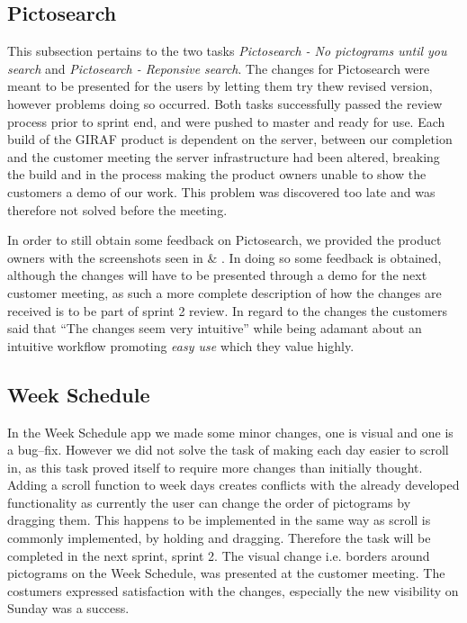 \subsection{Pictosearch}
This subsection pertains to the two tasks \textit{Pictosearch - No pictograms until you search} and \textit{Pictosearch - Reponsive search}.
The changes for Pictosearch were meant to be presented for the users by letting them try thew revised version, however problems doing so occurred.
Both tasks successfully passed the review process prior to sprint end, and were pushed to master and ready for use.
Each build of the GIRAF product is dependent on the server, between our completion and the customer meeting the server infrastructure had been altered, breaking the build and in the process making the product owners unable to show the customers a demo of our work.
This problem was discovered too late and was therefore not solved before the meeting.

In order to still obtain some feedback on Pictosearch, we provided the product owners with the screenshots seen in  \& .
In doing so some feedback is obtained, although the changes will have to be presented through a demo for the next customer meeting, as such a more complete description of how the changes are received is to be part of sprint 2 review.
In regard to the changes the customers said that \enquote{The changes seem very intuitive} while being adamant about an intuitive workflow promoting \textit{easy use} which they value highly.

\subsection{Week Schedule}
In the Week Schedule app we made some minor changes, one is visual and one is a bug--fix.
However we did not solve the task of making each day easier to scroll in, as this task proved itself to require more changes than initially thought.
Adding a scroll function to week days creates conflicts with the already developed functionality as currently the user can change the order of pictograms by dragging them.
This happens to be implemented in the same way as scroll is commonly implemented, by holding and dragging.
Therefore the task will be completed in the next sprint, sprint 2.
The visual change i.e. borders around pictograms on the Week Schedule, was presented at the customer meeting.
The costumers expressed satisfaction with the changes, especially the new visibility on Sunday was a success.
